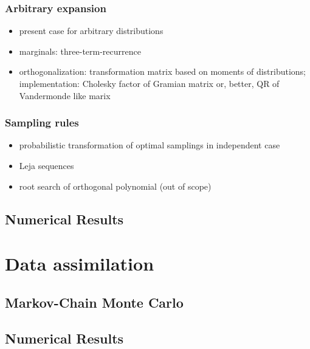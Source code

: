 \subsection{Arbitrary expansion}
\label{sec:arbitrary-expansion}

\begin{itemize}
\item present case for arbitrary distributions
\item marginals: three-term-recurrence
\item orthogonalization: transformation matrix based on moments of
  distributions; implementation: Cholesky factor of Gramian matrix or,
  better, QR of Vandermonde like marix
\end{itemize}

\subsection{Sampling rules}
\label{sec:sampling-rules}

\begin{itemize}
\item probabilistic transformation of optimal samplings in independent
  case
\item Leja sequences
\item root search of orthogonal polynomial (out of scope)
\end{itemize}

\section{Numerical Results}
\label{sec:up-numerical-results}


\chapter{Data assimilation}
\label{cha:data-assimilation}

\section{Markov-Chain Monte Carlo}
\label{sec:markov-chain-monte}


\section{Numerical Results}
\label{sec:da-numerical-results}


